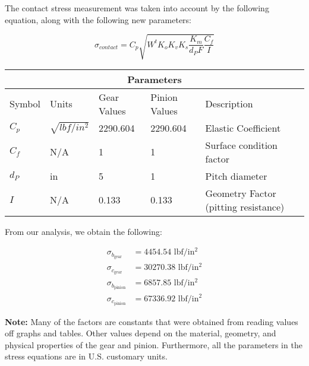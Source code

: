 \documentclass[letterpaper,12pt]{article}
\begin{document}
\noindent The contact stress measurement was taken into account by the following equation, along with the following new parameters:

\begin{equation}
\sigma_{contact} = C_{p}\sqrt{W^t K_o K_v K_s \frac{K_m}{d_P F}\frac{C_f}{I}}
\end{equation}

\begin{center}
	\begin{tabular}{ |p{2cm}||p{2cm}|p{2.3cm}|p{2.3cm}|p{6cm}|  }
		\hline
		\multicolumn{5}{|c|}{Parameters} \\
		\hline
		Symbol & Units & Gear Values & Pinion Values & Description\\
		\hline
		$C_p$ & $\sqrt{lbf/in^2}$ & 2290.604 & 2290.604 & Elastic Coefficient\\
		$C_f$ & N/A & 1 & 1 & Surface condition factor\\
		$d_P$ & in & 5 & 1 & Pitch diameter\\
		$I$ & N/A & 0.133 & 0.133 & Geometry Factor (pitting resistance)\\
		\hline
	\end{tabular}
\end{center}

\noindent From our analysis, we obtain the following: 

\begin{align*}
    \sigma_{b_{\text{gear}}} &= 4454.54 \text{ lbf/in$^2$} \\
    \sigma_{c_{\text{gear}}} &= 30270.38 \text{ lbf/in$^2$} \\
    \sigma_{b_{\text{pinion}}} &= 6857.85 \text{ lbf/in$^2$} \\
    \sigma_{c_{\text{pinion}}} &= 67336.92 \text{ lbf/in$^2$} 
\end{align*}

\noindent\textbf{Note:} Many of the factors are constants that were obtained from reading values off graphs and tables. Other values depend on the material, geometry, and physical properties of the gear and pinion. Furthermore, all the parameters in the stress equations are in U.S. customary units. \\
\end{document}
